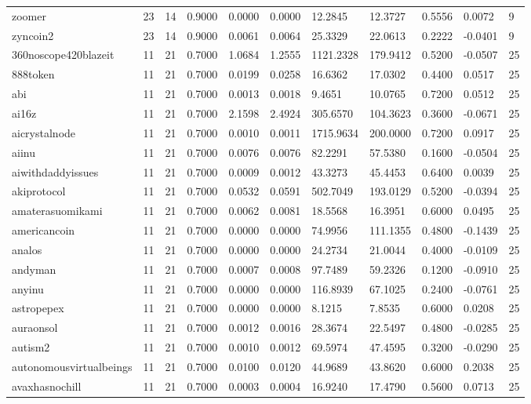 \begin{table}[htbp]
\begin{tabular}{lllllllllll}
zoomer & 23 & 14 & 0.9000 & 0.0000 & 0.0000 & 12.2845 & 12.3727 & 0.5556 & 0.0072 & 9 \\
zyncoin2 & 23 & 14 & 0.9000 & 0.0061 & 0.0064 & 25.3329 & 22.0613 & 0.2222 & -0.0401 & 9 \\
360noscope420blazeit & 11 & 21 & 0.7000 & 1.0684 & 1.2555 & 1121.2328 & 179.9412 & 0.5200 & -0.0507 & 25 \\
888token & 11 & 21 & 0.7000 & 0.0199 & 0.0258 & 16.6362 & 17.0302 & 0.4400 & 0.0517 & 25 \\
abi & 11 & 21 & 0.7000 & 0.0013 & 0.0018 & 9.4651 & 10.0765 & 0.7200 & 0.0512 & 25 \\
ai16z & 11 & 21 & 0.7000 & 2.1598 & 2.4924 & 305.6570 & 104.3623 & 0.3600 & -0.0671 & 25 \\
aicrystalnode & 11 & 21 & 0.7000 & 0.0010 & 0.0011 & 1715.9634 & 200.0000 & 0.7200 & 0.0917 & 25 \\
aiinu & 11 & 21 & 0.7000 & 0.0076 & 0.0076 & 82.2291 & 57.5380 & 0.1600 & -0.0504 & 25 \\
aiwithdaddyissues & 11 & 21 & 0.7000 & 0.0009 & 0.0012 & 43.3273 & 45.4453 & 0.6400 & 0.0039 & 25 \\
akiprotocol & 11 & 21 & 0.7000 & 0.0532 & 0.0591 & 502.7049 & 193.0129 & 0.5200 & -0.0394 & 25 \\
amaterasuomikami & 11 & 21 & 0.7000 & 0.0062 & 0.0081 & 18.5568 & 16.3951 & 0.6000 & 0.0495 & 25 \\
americancoin & 11 & 21 & 0.7000 & 0.0000 & 0.0000 & 74.9956 & 111.1355 & 0.4800 & -0.1439 & 25 \\
analos & 11 & 21 & 0.7000 & 0.0000 & 0.0000 & 24.2734 & 21.0044 & 0.4000 & -0.0109 & 25 \\
andyman & 11 & 21 & 0.7000 & 0.0007 & 0.0008 & 97.7489 & 59.2326 & 0.1200 & -0.0910 & 25 \\
anyinu & 11 & 21 & 0.7000 & 0.0000 & 0.0000 & 116.8939 & 67.1025 & 0.2400 & -0.0761 & 25 \\
astropepex & 11 & 21 & 0.7000 & 0.0000 & 0.0000 & 8.1215 & 7.8535 & 0.6000 & 0.0208 & 25 \\
auraonsol & 11 & 21 & 0.7000 & 0.0012 & 0.0016 & 28.3674 & 22.5497 & 0.4800 & -0.0285 & 25 \\
autism2 & 11 & 21 & 0.7000 & 0.0010 & 0.0012 & 69.5974 & 47.4595 & 0.3200 & -0.0290 & 25 \\
autonomousvirtualbeings & 11 & 21 & 0.7000 & 0.0100 & 0.0120 & 44.9689 & 43.8620 & 0.6000 & 0.2038 & 25 \\
avaxhasnochill & 11 & 21 & 0.7000 & 0.0003 & 0.0004 & 16.9240 & 17.4790 & 0.5600 & 0.0713 & 25 \\

\end{tabular}
\end{table}
